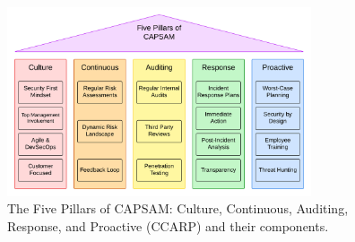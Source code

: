     \begin{figure}[htbp]
        \centering
        \includegraphics[width=0.8\textwidth]{figures/CAPSAM-Pillars.png}
        \caption{The Five Pillars of CAPSAM: Culture, Continuous, Auditing, Response, and Proactive (CCARP) and their components.}
        \label{fig:CAPSAM}
    \end{figure}

